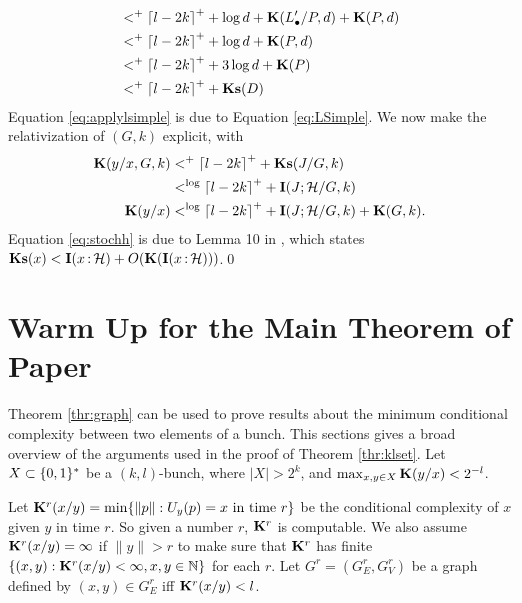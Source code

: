 \documentclass[11pt]{article}\textwidth 6.5in\textheight 9in
\begin{document}
\begin{prf}
\begin{align}
	\nonumber
	&<^+{\lceil l-2k\rceil}^++\log d + {\mathbf K}(L'_\bullet/P,d)+{\mathbf K}(P,d)\\
	\label{eq:applylsimple}
	&<^+{\lceil l-2k\rceil}^++\log d +{\mathbf K}(P,d)\\
	\nonumber
	&<^+{\lceil l-2k\rceil}^++3\log d +{\mathbf K}(P)\\
	\nonumber
	&<^+{\lceil l-2k\rceil}^++\mathbf{Ks}(D)
	\end{align}
		Equation \ref{eq:applylsimple} is due to Equation \ref{eq:LSimple}. We now make the relativization of $(G,k)$ explicit, with
	\begin{align}
	\nonumber
	{\mathbf K}(y/x,G,k) &<^+{\lceil l-2k\rceil}^++\mathbf{Ks}(J/G,k)\\
	\label{eq:stochh}
	&<^{\log}{\lceil l-2k\rceil}^++{\mathbf I}(J;\mathcal{H}/G,k)\\
	\nonumber
	{\mathbf K}(y/x) & <^{\log}{\lceil l-2k\rceil}^++{\mathbf I}(J;\mathcal{H}/G,k)+{\mathbf K}(G,k).
	\end{align} Equation \ref{eq:stochh} is due to Lemma 10 in \cite{Epstein21}, which states $\mathbf{Ks}(x)<{\mathbf I}(x\,{:}\,{\mathcal H})+O({\mathbf K}({\mathbf I}(x\,{:}\,{\mathcal H})))$.\qed\\
\end{prf}

\section{Warm Up for the Main Theorem of Paper}
Theorem \ref{thr:graph} can be used to prove results about the minimum conditional complexity between two elements of a bunch. This sections gives a broad overview of the arguments used in the proof of Theorem \ref{thr:klset}. Let $X\subset\{0,1\}^*$ be a $(k,l)$-bunch, where $|X|> 2^k$, and $\max_{x,y\in X}{\mathbf K}(y/x)< 2^{-l}$. 

Let ${\mathbf K}^r(x/y)=\min\{\|p\|:U_y(p)=x\textrm{ in time }r\}$ be the conditional complexity of $x$ given $y$ in time $r$. So given a number $r$, ${\mathbf K}^r$ is computable. We also assume ${\mathbf K}^r(x/y)=\infty$ if $\|y\|>r$ to make sure that ${\mathbf K}^r$ has finite $\{(x,y) : {\mathbf K}^r(x/y)<\infty, x,y\in\mathbb{N}\}$ for each $r$. Let $G^r=(G^r_E,G^r_V)$ be a graph defined by $(x,y)\in G^r_E$ iff ${\mathbf K}^r(x/y)<l$.
\end{document}
